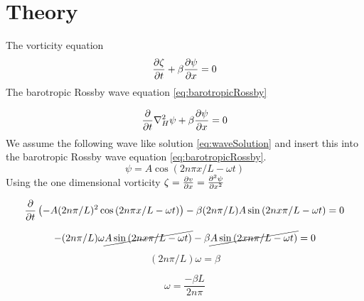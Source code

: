 \section{Theory}
The vorticity equation
\begin{equation}\label{eq:gov_vort}
    \pdv{\zeta}{t} + \beta \pdv{\psi}{x} = 0
\end{equation}
The barotropic Rossby wave equation \cref{eq:barotropicRossby}

\begin{equation}\label{eq:barotropicRossby}
    \frac{\partial}{\partial t}{} \nabla_H^2 \psi + \beta \pdv{\psi}{x} = 0
\end{equation}
We assume the following wave like solution \cref{eq:waveSolution} and
insert this into the barotropic Rossby wave equation \cref{eq:barotropicRossby}.
\begin{equation}\label{eq:waveSolution}
    \psi = A\cos{(2n\pi x /L - \omega t)}
\end{equation}
Using the one dimensional vorticity $\zeta = \pdv{v}{x} = \pdv[2]{\psi}{x}$

\begin{equation}
    \pdv{}{t} \left(-A (2n\pi/L)^2  \cos{(2n\pi x/L - \omega t)}\right) - \beta
     (2n\pi/L) A \sin{(2n x\pi/L - \omega t) = 0}
\end{equation}

\begin{equation}
    -(2n\pi/L)\omega \cancel{A\sin{(2n x\pi/L - \omega t)}} - \beta
    \cancel{A\sin{(2 xn\pi/L - \omega t)}} = 0
\end{equation}

\begin{equation}
    (2n\pi / L) \omega = \beta
\end{equation}

\begin{equation}\label{eq:omega1}
    \omega = \frac{-\beta L}{2n\pi}
\end{equation}


